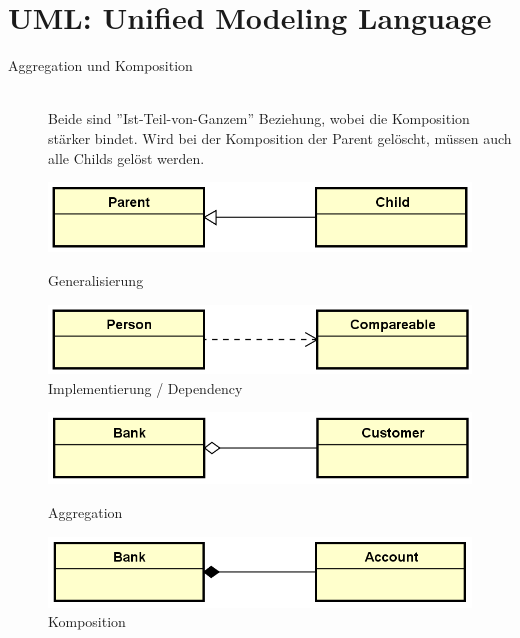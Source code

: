 \section{UML: Unified Modeling Language}
\begin{description}
	\item[Aggregation und Komposition] \hfill \\
	Beide sind ''Ist-Teil-von-Ganzem'' Beziehung, wobei die Komposition stärker bindet. Wird bei der Komposition der Parent gelöscht, müssen auch alle Childs gelöst werden.
\end{description}
\begin{figure}[h]
	\centering
	\begin{minipage}[t]{0.4\textwidth}
		\centering
		\includegraphics[width=\textwidth]{images/generalisierung}
		\caption{Generalisierung}
	\end{minipage}
	\begin{minipage}[t]{0.4\textwidth}
		\centering
		\includegraphics[width=\textwidth]{images/implements}
		\caption{Implementierung / Dependency}
	\end{minipage}
\end{figure}
\begin{figure}[ht!]
	\centering
	\begin{minipage}[t]{0.4\textwidth}
		\centering
		\includegraphics[width=\textwidth]{images/aggregation}
		\caption{Aggregation}
	\end{minipage}
	\begin{minipage}[t]{0.4\textwidth}
		\centering
		\includegraphics[width=\textwidth]{images/composition}
		\caption{Komposition}
	\end{minipage}
\end{figure}
